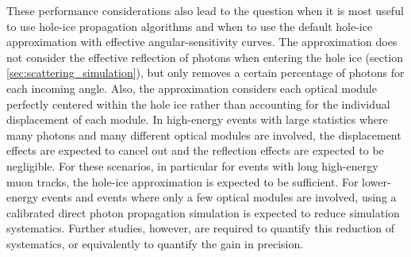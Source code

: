 These performance considerations also lead to the question when it is most useful to use hole-ice propagation algorithms and when to use the default hole-ice approximation with effective angular-sensitivity curves.
The approximation does not consider the effective reflection of photons when entering the hole ice (section \ref{sec:scattering_simulation}), but only removes a certain percentage of photons for each incoming angle. Also, the approximation considers each optical module perfectly centered within the hole ice rather than accounting for the individual displacement of each module.
In high-energy events with large statistics where many photons and many different optical modules are involved, the displacement effects are expected to cancel out and the reflection effects are expected to be negligible. For these scenarios, in particular for events with long high-energy muon tracks, the hole-ice approximation is expected to be sufficient.
For lower-energy events and events where only a few optical modules are involved, using a calibrated direct photon propagation simulation is expected to reduce simulation systematics. Further studies, however, are required to quantify this reduction of systematics, or equivalently to quantify the gain in precision.\followup

